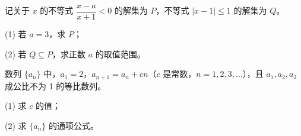 \begin{question}
记关于 $x$ 的不等式 $\dfrac{x-a}{x+1}<0$ 的解集为 $P$，不等式 $|x-1|\leq 1$ 的解集为 $Q$。

(1) 若 $a=3$，求 $P$；

(2) 若 $Q\subseteq P$，求正数 $a$ 的取值范围。

\end{question}
\begin{question}
数列 $\{a_n\}$ 中，$a_1=2$，$a_{n+1}=a_n+cn$（$c$ 是常数，$n=1,2,3,\ldots$），且 $a_1,a_2,a_3$ 成公比不为 1 的等比数列。

(1) 求 $c$ 的值；

(2) 求 $\{a_n\}$ 的通项公式。

\end{question}

